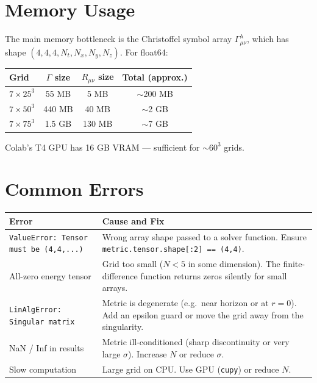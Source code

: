 \documentclass[11pt, a4paper, twoside]{report}
\begin{document}
\section{Memory Usage}

The main memory bottleneck is the Christoffel symbol array
$\varGamma^\lambda_{\mu\nu}$, which has shape
$(4, 4, 4, N_t, N_x, N_y, N_z)$.  For float64:

\begin{center}
\begin{tabular}{lccc}
  \toprule
  Grid & $\varGamma$ size & $R_{\mu\nu}$ size & Total (approx.) \\
  \midrule
  $7 \times 25^3$ & 55 MB  & 5 MB  & $\sim$200 MB \\
  $7 \times 50^3$ & 440 MB & 40 MB & $\sim$2 GB \\
  $7 \times 75^3$ & 1.5 GB & 130 MB& $\sim$7 GB \\
  \bottomrule
\end{tabular}
\end{center}

Colab's T4 GPU has 16 GB VRAM — sufficient for $\sim 60^3$ grids.

\section{Common Errors}

\begin{center}
\begin{tabularx}{\linewidth}{lX}
  \toprule
  Error & Cause and Fix \\
  \midrule
  \texttt{ValueError: Tensor must be (4,4,...)} &
  Wrong array shape passed to a solver function.
  Ensure \texttt{metric.tensor.shape[:2] == (4,4)}. \\[0.3em]

  All-zero energy tensor &
  Grid too small ($N < 5$ in some dimension).
  The finite-difference function returns zeros silently for small arrays. \\[0.3em]

  \texttt{LinAlgError: Singular matrix} &
  Metric is degenerate (e.g.\ near horizon or at $r=0$).
  Add an epsilon guard or move the grid away from the singularity. \\[0.3em]

  NaN / Inf in results &
  Metric ill-conditioned (sharp discontinuity or very large $\sigma$).
  Increase $N$ or reduce $\sigma$. \\[0.3em]

  Slow computation &
  Large grid on CPU. Use GPU (\texttt{cupy}) or reduce $N$. \\
  \bottomrule
\end{tabularx}
\end{center}
\end{document}
